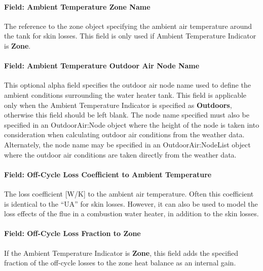 \paragraph{Field: Ambient Temperature Zone Name}\label{field-ambient-temperature-zone-name-001}

The reference to the zone object specifying the ambient air temperature around the tank for skin losses. This field is only used if Ambient Temperature Indicator is \textbf{Zone}.

\paragraph{Field: Ambient Temperature Outdoor Air Node Name}\label{field-ambient-temperature-outdoor-air-node-name-000}

This optional alpha field specifies the outdoor air node name used to define the ambient conditions surrounding the water heater tank. This field is applicable only when the Ambient Temperature Indicator is specified as \textbf{Outdoors}, otherwise this field should be left blank. The node name specified must also be specified in an OutdoorAir:Node object where the height of the node is taken into consideration when calculating outdoor air conditions from the weather data. Alternately, the node name may be specified in an OutdoorAir:NodeList object where the outdoor air conditions are taken directly from the weather data.

\paragraph{Field: Off-Cycle Loss Coefficient to Ambient Temperature}\label{field-off-cycle-loss-coefficient-to-ambient-temperature}

The loss coefficient {[}W/K{]} to the ambient air temperature. Often this coefficient is identical to the ``UA'' for skin losses. However, it can also be used to model the loss effects of the flue in a combustion water heater, in addition to the skin losses.

\paragraph{Field: Off-Cycle Loss Fraction to Zone}\label{field-off-cycle-loss-fraction-to-zone}

If the Ambient Temperature Indicator is \textbf{Zone}, this field adds the specified fraction of the off-cycle losses to the zone heat balance as an internal gain.

